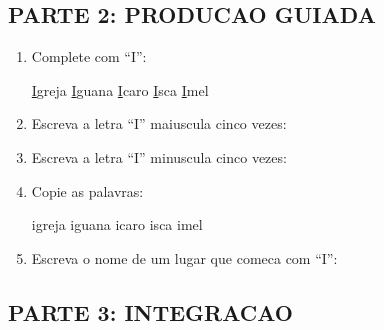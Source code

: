 \begin{exercicio}
\subsection*{PARTE 2: PRODUCAO GUIADA}

\begin{enumerate}[resume]
  \item Complete com ``I'':
  \begin{center}
  \underline{I}greja \quad \underline{I}guana \quad \underline{I}caro \quad \underline{I}sca \quad \underline{I}mel
  \end{center}

  \item Escreva a letra ``I'' maiuscula cinco vezes:
  \begin{center}
  \underline{\hspace{1.5cm}} \quad \underline{\hspace{1.5cm}} \quad \underline{\hspace{1.5cm}} \quad \underline{\hspace{1.5cm}} \quad \underline{\hspace{1.5cm}}
  \end{center}

  \item Escreva a letra ``I'' minuscula cinco vezes:
  \begin{center}
  \underline{\hspace{1.5cm}} \quad \underline{\hspace{1.5cm}} \quad \underline{\hspace{1.5cm}} \quad \underline{\hspace{1.5cm}} \quad \underline{\hspace{1.5cm}}
  \end{center}

  \item Copie as palavras:
  \begin{center}
  igreja \quad iguana \quad icaro \quad isca \quad imel
  \end{center}

  \item Escreva o nome de um lugar que comeca com ``I'':
  \begin{center}
  \underline{\hspace{6cm}}
  \end{center}
\end{enumerate}

\subsection*{PARTE 3: INTEGRACAO}


\end{exercicio}
